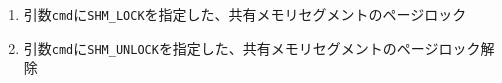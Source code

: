 \documentclass[twoside,11pt,fleqn]{book}
\begin{document}
\begin{enumerate}
\item 引数\texttt{cmd}に\texttt{SHM\_LOCK}を指定した、共有メモリセグメントのページロック
\item 引数\texttt{cmd}に\texttt{SHM\_UNLOCK}を指定した、共有メモリセグメントのページロック解除
\end{enumerate}
\end{document}
